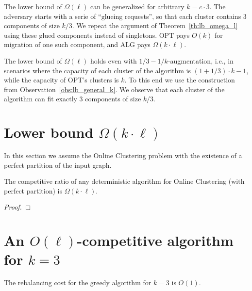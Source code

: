 \begin{observation}
  The lower bound of $\Omega(\ell)$ can be generalized for arbitrary $k = c\cdot 3$.
  The adversary starts with a serie of ``glueing requests'', so that each cluster contains 3 components of size $k/3$.
  We repeat the argument of Theorem~\ref{th:lb_omega_l} using these glued components instead of singletons.
  OPT pays $O(k)$ for migration of one such component, and ALG pays $\Omega(k \cdot \ell)$.
  \label{obs:lb_general_k}
\end{observation}

\begin{observation}
  The lower bound of $\Omega(\ell)$ holds even with $1/3-1/k$-augmentation, i.e., in scenarios where the capacity of each cluster of the algorithm is $(1+1/3)\cdot k - 1$, while the capacity of OPT's clusters is $k$.
  To this end we use the construction from Observation~\ref{obs:lb_general_k}.
  We observe that each cluster of the algorithm can fit exactly $3$ components of size $k/3$.
\end{observation}


\section{Lower bound $\Omega(k\cdot \ell)$}


In this section we assume the Online Clustering problem with the existence of a perfect partition of the input graph.

\begin{theorem}
  The competitive ratio of any deterministic algorithm for Online Clustering (with perfect partition) is $\Omega(k\cdot \ell)$.
\end{theorem}

\begin{proof}
  
\end{proof}

\section{An $O(\ell)$-competitive algorithm for $k=3$}

\begin{theorem}
  The rebalancing cost for the greedy algorithm for $k=3$ is $O(1)$.
  \label{rebalancing-cost}
\end{theorem}

